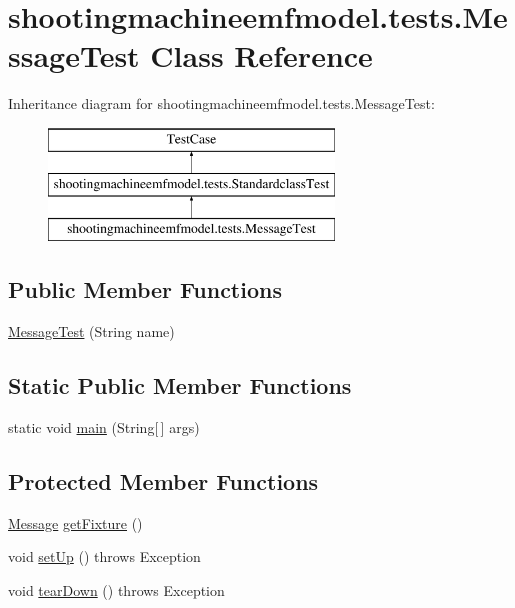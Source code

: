\hypertarget{classshootingmachineemfmodel_1_1tests_1_1_message_test}{\section{shootingmachineemfmodel.\-tests.\-Message\-Test Class Reference}
\label{classshootingmachineemfmodel_1_1tests_1_1_message_test}
}
Inheritance diagram for shootingmachineemfmodel.\-tests.\-Message\-Test\-:\begin{figure}[H]
\begin{center}
\leavevmode
\includegraphics[height=3.000000cm]{classshootingmachineemfmodel_1_1tests_1_1_message_test}
\end{center}
\end{figure}
\subsection*{Public Member Functions}
\begin{DoxyCompactItemize}
\item 
\hyperlink{classshootingmachineemfmodel_1_1tests_1_1_message_test_a0e2d6e146de19be47cb7571364a7d75d}{Message\-Test} (String name)
\end{DoxyCompactItemize}
\subsection*{Static Public Member Functions}
\begin{DoxyCompactItemize}
\item 
static void \hyperlink{classshootingmachineemfmodel_1_1tests_1_1_message_test_ae556966a483a8ee6fd84052d0a70764a}{main} (String\mbox{[}$\,$\mbox{]} args)
\end{DoxyCompactItemize}
\subsection*{Protected Member Functions}
\begin{DoxyCompactItemize}
\item 
\hyperlink{interfaceshootingmachineemfmodel_1_1_message}{Message} \hyperlink{classshootingmachineemfmodel_1_1tests_1_1_message_test_a6de31489f5cd4997e9f1e48f4ec165ee}{get\-Fixture} ()
\item 
void \hyperlink{classshootingmachineemfmodel_1_1tests_1_1_message_test_a4b525efb8928c520b1521a3a39794176}{set\-Up} ()  throws Exception 
\item 
void \hyperlink{classshootingmachineemfmodel_1_1tests_1_1_message_test_a5eadc06ce9c2a81d1e9616a5d8c6b4cc}{tear\-Down} ()  throws Exception 
\end{DoxyCompactItemize}
